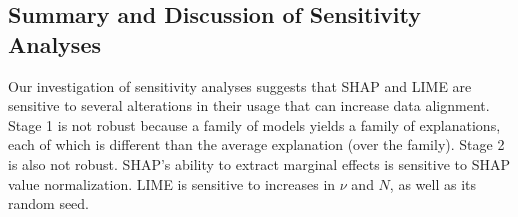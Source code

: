 \documentclass[mnsc,blindrev]{informs3}
\begin{document}
    \subsection{Summary and Discussion of Sensitivity Analyses}
            \label{sec:summary_and_strategies}
             Our investigation of sensitivity analyses suggests that SHAP and LIME are sensitive to several alterations in their usage that can increase data alignment. Stage 1 is not robust because a family of models yields a family of explanations, each of which is different than the average explanation (over the family). Stage 2 is also not robust. SHAP's ability to extract marginal effects is sensitive to SHAP value normalization. LIME is sensitive to increases in $\nu$ and $N$, as well as its random seed. 
             

            
\end{document}
